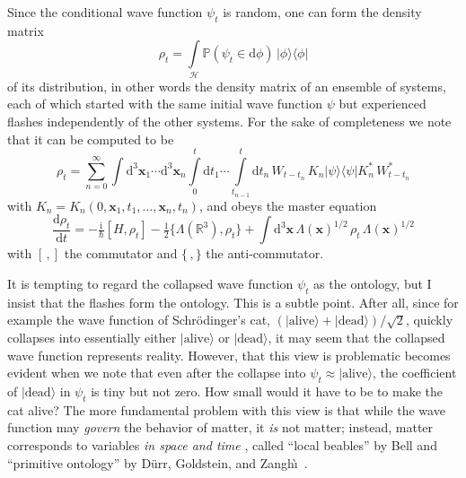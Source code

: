 \documentclass[12pt]{article}
\newcommand{\RRR}{\mathbb{R}}
\newcommand{\PPP}{\mathbb{P}}
\newcommand{\Hilbert}{\mathscr{H}}
\newcommand{\vx}{\boldsymbol{x}}
\newcommand{\D}{\mathrm{d}} %
\newcommand{\I}{\mathrm{i}} %
\newcommand{\1}{1}
\newcommand{\z}[1]{{#1}}
\begin{document}
\z{Since the conditional wave function $\psi_t$ is random, one can form the density matrix}
\begin{equation}
  \rho_t = \int\limits_\Hilbert \PPP(\psi_t \in \D \phi) \, |\phi\rangle \langle \phi|  
\end{equation}
\z{of its distribution, in other words the density matrix of an ensemble of systems, each of which started with the same initial wave function $\psi$ but experienced flashes independently of the other systems. For the sake of completeness we note that it can be computed to be}
\begin{equation}
  \rho_t = \sum_{n=0}^\infty \int \D^3 \vx_1 \cdots \D^3\vx_n \int\limits_0^t \D t_1 
  \cdots \int\limits_{t_{n-1}}^t \D t_n \, W_{t-t_n} \, K_n |\psi \rangle \langle \psi | K_n^*
  \, W^*_{t-t_n}
\end{equation}
\z{with $K_n = K_n(0,\vx_1,t_1, \ldots, \vx_n,t_n)$, and obeys the master equation}
\begin{equation}
  \frac{\D \rho_t}{\D t} = -\tfrac{\I}{\hbar} [H,\rho_t] - \tfrac{1}{2} 
  \{\Lambda(\RRR^3), \rho_t \} + \int \D^3 \vx \, \Lambda (\vx)^{1/2} \,
  \rho_t \, \Lambda(\vx)^{1/2}
\end{equation}
\z{with $[\,,]$ the commutator and $\{\,,\}$ the anti-commutator.}

It is tempting to regard the collapsed wave function $\psi_t$ as the ontology, but I insist that the flashes form the ontology. This is a subtle point. After all, since for example the wave function of Schr\"odinger's cat, $(|\text{alive}\rangle + |\text{dead}\rangle)/\sqrt{2}$, quickly collapses into essentially either $|\text{alive}\rangle$ or $|\text{dead}\rangle$, it may seem that the collapsed wave function represents reality. However, that this view is problematic becomes evident when we note that even after the collapse into $\psi_t \approx |\text{alive}\rangle$, the coefficient of $|\text{dead}\rangle$ in $\psi_t$ is tiny but not zero. How small would it have to be to make the cat alive? The more fundamental problem with this view is that while the wave function may \emph{govern} the behavior of matter, it \emph{is} not matter; instead, matter corresponds to variables \emph{in space and time} \cite{AGTZ}, called ``local beables'' by Bell \cite{Bellbook} and ``primitive ontology'' by D\"urr, Goldstein, and Zangh\`\i~\cite{DGZ04}.
\end{document}
